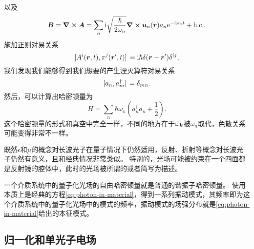 以及
\begin{equation}
    \vb*{B} = \curl{\vb*{A}} = \sum_n \mathrm{i} \sqrt{\frac{\hbar}{2\omega_n}} \curl{\vb*{u}_n(\vb*{r})} a_n \mathrm{e}^{-\mathrm{i} \omega_n t} + \text{h.c.}.
\end{equation}
施加正则对易关系
\begin{equation}
    \comm*{A^i(\vb*{r}, t)}{\pi^j(\vb*{r}', t)} = \ii \hbar \delta(\vb*{r} - \vb*{r}') \delta^{ij},
\end{equation}
我们发现我们能够得到我们想要的产生湮灭算符对易关系
\begin{equation}
    \comm*{a_n}{a_m^\dagger} = \delta_{mn}.
\end{equation}
然后，可以计算出哈密顿量为
\begin{equation}
    H = \sum_n \hbar \omega_n \left( a^\dagger_n a_n + \frac{1}{2} \right).
\end{equation}
这个哈密顿量的形式和真空中完全一样，不同的地方在于$\omega_{\vb*{k}}$被$\omega_n$取代，色散关系可能变得非常不一样。

既然$\epsilon$和$\mu$的概念对长波光子在量子情况下仍然适用，反射、折射等概念对长波光子仍然有意义，且和经典情况非常类似。
特别的，光场可能被约束在一个四面都是反射镜的腔体中，此时的光场被所谓的或者简写为描述。

一个介质系统中的量子化光场的自由哈密顿量就是普通的谐振子哈密顿量。
使用本质上是经典的方程\eqref{eq:photon-in-material}，得到一系列振动模式，其频率即为这个介质系统中的量子化光场中的模式的频率，振动模式的场强分布就是\eqref{eq:photon-in-material}给出的本征模式。

\subsection{归一化和单光子电场}

